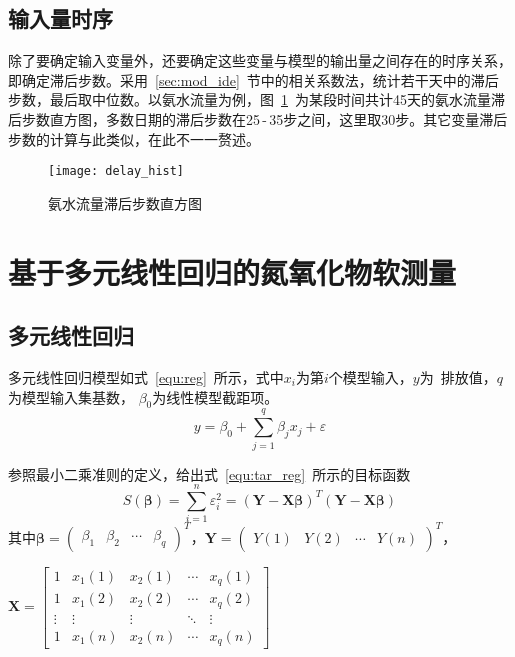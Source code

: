 \subsection{输入量时序}

除了要确定输入变量外，还要确定这些变量与模型的输出量之间存在的时序关系，即确定滞后步数。采用~\ref{sec:mod_ide}~节中的相关系数法，统计若干天中的滞后步数，最后取中位数。以氨水流量为例，图~\ref{fig:delay_hist}~为某段时间共计45天的氨水流量滞后步数直方图，多数日期的滞后步数在25$\,$-$\,$35步之间，这里取30步。其它变量滞后步数的计算与此类似，在此不一一赘述。
\begin{figure}[!hbt]
\centering
\texttt{[image: delay\_hist]}
\caption{氨水流量滞后步数直方图} \label{fig:delay_hist}
\end{figure}
\section{基于多元线性回归的氮氧化物软测量}
\subsection{多元线性回归}
多元线性回归模型如式~\ref{equ:reg}~所示，式中$x_{i}$为第$i$个模型输入，$y$为~排放值，$q$为模型输入集基数， $\beta_{0}$为线性模型截距项。
\begin{equation}
\label{equ:reg}
y= \beta_{0}+\sum_{j=1}^{q}{\beta_{j}}{x_{j}}+\varepsilon
\end{equation} 

参照最小二乘准则的定义，给出式~\ref{equ:tar_reg}~所示的目标函数
\begin{equation}
\label{equ:tar_reg}
{S}(\bm{\beta})=\sum_{i=1}^{n}{\varepsilon_{i}^{2}}=(\bm{Y}-\bm{X}\bm{\beta})^{T}(\bm{Y}-\bm{X}\bm{\beta})
\end{equation}
其中$\bm{\beta} = {\begin{pmatrix} \beta_{1} & \beta_{2} &\cdots & \beta_{q} \end{pmatrix}}^{T}$，$\bm{Y} = {\begin{pmatrix} Y(1) & Y(2) &\cdots & Y(n) \end{pmatrix}}^{T}$，

\noindent
$\bm{X} = \left[{\begin{array}{ccccc}
1&x_{1}{(1)}  & x_{2}{(1)}&\cdots&x_{q}{(1)}\\
1&x_{1}{(2)}  & x_{2}{(2)}&\cdots&x_{q}{(2)}\\
\vdots & \vdots  &\vdots &\ddots  &\vdots\\
1&x_{1}{(n)}  & x_{2}{(n)}&\cdots&x_{q}{(n)}
\end{array}}\right]$
   
